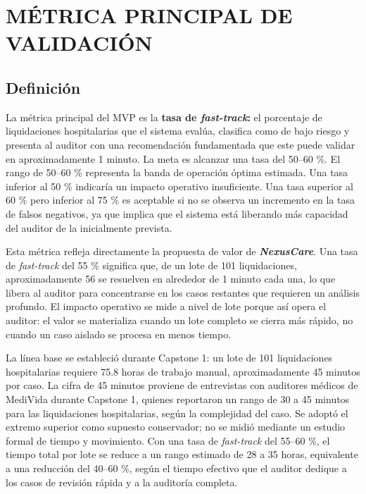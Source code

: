 \chapter{MÉTRICA PRINCIPAL DE VALIDACIÓN}

\section{Definición}

La métrica principal del MVP es la \textbf{tasa de \textit{fast-track}:} el porcentaje de liquidaciones hospitalarias que el sistema evalúa, clasifica como de bajo riesgo y presenta al auditor con una recomendación fundamentada que este puede validar en aproximadamente 1 minuto. La meta es alcanzar una tasa del 50–60 \%. El rango de 50–60 \% representa la banda de operación óptima estimada. Una tasa inferior al 50 \% indicaría un impacto operativo insuficiente. Una tasa superior al 60 \% pero inferior al 75 \% es aceptable si no se observa un incremento en la tasa de falsos negativos, ya que implica que el sistema está liberando más capacidad del auditor de la inicialmente prevista.

Esta métrica refleja directamente la propuesta de valor de \textbf{\textit{NexusCare}}. Una tasa de \textit{fast-track} del 55 \% significa que, de un lote de 101 liquidaciones, aproximadamente 56 se resuelven en alrededor de 1 minuto cada una, lo que libera al auditor para concentrarse en los casos restantes que requieren un análisis profundo. El impacto operativo se mide a nivel de lote porque así opera el auditor: el valor se materializa cuando un lote completo se cierra más rápido, no cuando un caso aislado se procesa en menos tiempo.

La línea base se estableció durante Capstone 1: un lote de 101 liquidaciones hospitalarias requiere 75.8 horas de trabajo manual, aproximadamente 45 minutos por caso. La cifra de 45 minutos proviene de entrevistas con auditores médicos de MediVida durante Capstone 1, quienes reportaron un rango de 30 a 45 minutos para las liquidaciones hospitalarias, según la complejidad del caso. Se adoptó el extremo superior como supuesto conservador; no se midió mediante un estudio formal de tiempo y movimiento. Con una tasa de \textit{fast-track} del 55–60 \%, el tiempo total por lote se reduce a un rango estimado de 28 a 35 horas, equivalente a una reducción del 40–60 \%, según el tiempo efectivo que el auditor dedique a los casos de revisión rápida y a la auditoría completa.

